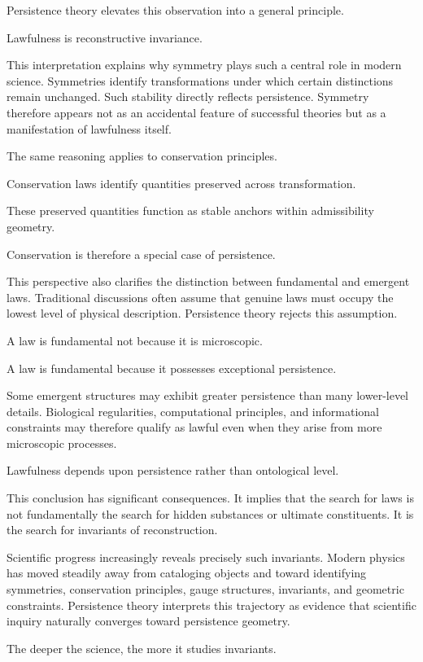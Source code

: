 \documentclass[12pt,oneside]{article}
\theoremstyle{definition}
\begin{document}
Persistence theory elevates this observation into a general principle.

Lawfulness is reconstructive invariance.

This interpretation explains why symmetry plays such a central role in modern science. Symmetries identify transformations under which certain distinctions remain unchanged. Such stability directly reflects persistence. Symmetry therefore appears not as an accidental feature of successful theories but as a manifestation of lawfulness itself.

The same reasoning applies to conservation principles.

Conservation laws identify quantities preserved across transformation.

These preserved quantities function as stable anchors within admissibility geometry.

Conservation is therefore a special case of persistence.

This perspective also clarifies the distinction between fundamental and emergent laws. Traditional discussions often assume that genuine laws must occupy the lowest level of physical description. Persistence theory rejects this assumption.

A law is fundamental not because it is microscopic.

A law is fundamental because it possesses exceptional persistence.

Some emergent structures may exhibit greater persistence than many lower-level details. Biological regularities, computational principles, and informational constraints may therefore qualify as lawful even when they arise from more microscopic processes.

Lawfulness depends upon persistence rather than ontological level.

This conclusion has significant consequences. It implies that the search for laws is not fundamentally the search for hidden substances or ultimate constituents. It is the search for invariants of reconstruction.

Scientific progress increasingly reveals precisely such invariants. Modern physics has moved steadily away from cataloging objects and toward identifying symmetries, conservation principles, gauge structures, invariants, and geometric constraints. Persistence theory interprets this trajectory as evidence that scientific inquiry naturally converges toward persistence geometry.

The deeper the science, the more it studies invariants.
\end{document}
